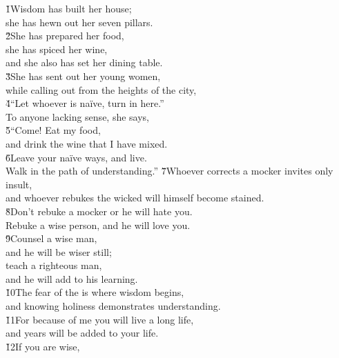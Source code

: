 \begin{poetry}
\poeml {}
\v{1}Wisdom has built her house; \\
\poeml she has hewn out her seven pillars. \\
\poeml \v{2}She has prepared her food, \\
\poemll    she has spiced her wine, \\
\poemlll       and she also has set her dining table. \\
\poeml \v{3}She has sent out her young women, \\
\poemll    while calling out from the heights of the city, \\
\poeml \v{4}``Let whoever is na\"{i}ve, turn in here.'' \\
\poemll    To anyone lacking sense, she says, \\
\poeml \v{5}``Come! Eat my food, \\
\poemll    and drink the wine that I have mixed. \\
\poeml \v{6}Leave your na\"{i}ve ways, and live. \\
\poemll    Walk in the path of understanding.''
\poeml \v{7}Whoever corrects a mocker invites only insult, \\
\poemll    and whoever rebukes the wicked will himself become stained. \\
\poeml \v{8}Don't rebuke a mocker or he will hate you. \\
\poemll    Rebuke a wise person, and he will love you. \\
\poeml \v{9}Counsel a wise man, \\
\poemll    and he will be wiser still; \\
\poeml teach a righteous man, \\
\poemll    and he will add to his learning. \\
\poeml \v{10}The fear of the  is where wisdom begins, \\
\poemll    and knowing holiness demonstrates understanding. \\
\poeml \v{11}For because of me you will live a long life, \\
\poemll    and years will be added to your life. \\
\poeml \v{12}If you are wise, \\

\end{poetry}
